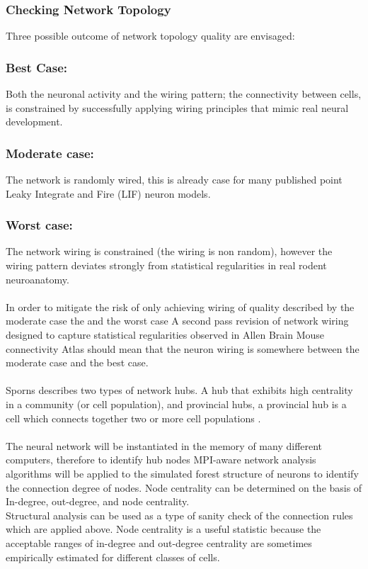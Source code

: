 \documentclass[a4paper,11pt]{article}
\begin{document}
\subsubsection{Checking Network Topology}

Three possible outcome of network topology quality are envisaged:

\subsubsection{Best Case:} Both the neuronal activity and the wiring pattern; the connectivity between cells, is constrained by successfully applying wiring principles that mimic real neural development.
\subsubsection{Moderate case:} The network is randomly wired, this is already case for many published point Leaky Integrate and Fire (LIF) neuron models.
\subsubsection{Worst case:} The network wiring is constrained (the wiring is non random), however the wiring pattern deviates strongly from statistical regularities in real rodent neuroanatomy.\\
\\
In order to mitigate the risk of only achieving wiring of quality described by the moderate case the and the worst case A second pass revision of network wiring designed to capture statistical regularities observed in Allen Brain Mouse connectivity Atlas should mean that the neuron wiring is somewhere between the moderate case and the best case.\\
\\
Sporns describes two types of network hubs. A hub that exhibits high centrality in a community (or cell population), and provincial hubs, a provincial hub is a cell which connects together two or more cell populations \cite{sporns2011networks}.\\
\\
The neural network will be instantiated in the memory of many different computers, therefore to identify hub nodes MPI-aware network analysis algorithms will be applied to the simulated forest structure of neurons to identify the connection degree of nodes. Node centrality can be determined on the basis of In-degree, out-degree, and node centrality. %
\\
Structural analysis can be used as a type of sanity check of the connection rules which are applied above. Node centrality is a useful statistic because the acceptable ranges of in-degree and out-degree centrality are sometimes empirically estimated for different classes of cells.\\
\\
\end{document}
